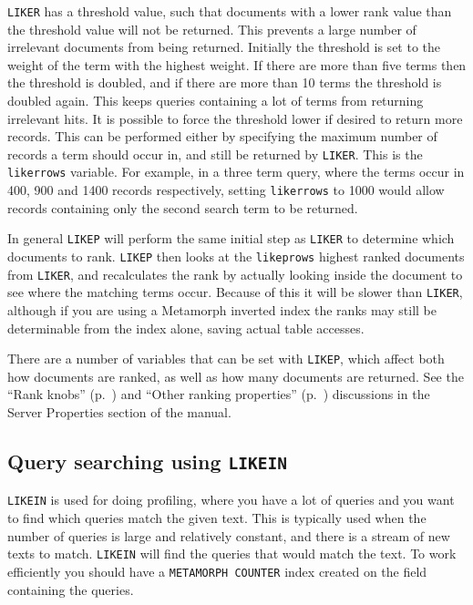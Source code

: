 \verb`LIKER` has a threshold value, such that documents with a lower
rank value than the threshold value will not be returned.  This prevents
a large number of irrelevant documents from being returned.  Initially
the threshold is set to the weight of the term with the highest weight.
If there are more than five terms then the threshold is doubled, and if
there are more than 10 terms the threshold is doubled again.  This keeps
queries containing a lot of terms from returning irrelevant hits.  It
is possible to force the threshold lower if desired to return more records.
This can be performed either by specifying the maximum number of records
a term should occur in, and still be returned by \verb`LIKER`.  This is the
\verb|likerrows| variable.  For example, in a three term query, where
the terms occur in 400, 900 and 1400 records respectively, setting
\verb|likerrows| to 1000 would allow records containing only the second
search term to be returned.

In general \verb`LIKEP` will perform the same initial step as \verb`LIKER` to
determine which documents to rank.  \verb`LIKEP` then looks at the
\verb|likeprows| highest ranked documents from \verb`LIKER`, and recalculates
the rank by actually looking inside the document to see where the
matching terms occur.  Because of this it will be slower than \verb`LIKER`,
although if you are using a Metamorph inverted index the ranks may
still be determinable from the index alone, saving actual table
accesses.

There are a number of variables that can be set with \verb`LIKEP`, which
affect both how documents are ranked, as well as how many documents
are returned.  See the ``Rank knobs'' (p.~\pageref{rankknobs}) and
``Other ranking properties'' (p.~\pageref{otherrank}) discussions
in the Server Properties section of the manual.

\subsection{Query searching using {\tt LIKEIN}}

\verb`LIKEIN` is used for doing profiling, where you have a lot of queries
and you want to find which queries match the given text.  This is typically
used when the number of queries is large and relatively constant, and there
is a stream of new texts to match.  \verb`LIKEIN` will find the queries
that would match the text.  To work efficiently you should have a
\verb`METAMORPH COUNTER` index created on the field containing the queries.

